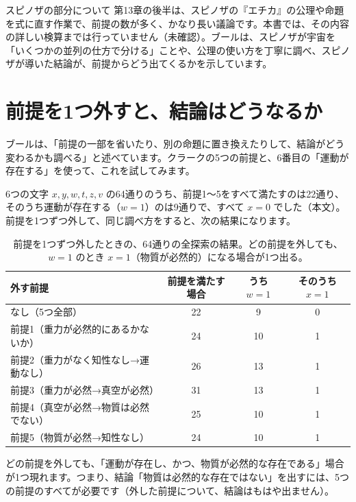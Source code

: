 \documentclass[a4paper,11pt,openany]{ltjsbook}
\begin{document}
\begin{notebox}{スピノザの部分について}
第13章の後半は、スピノザの『エチカ』の公理や命題を式に直す作業で、前提の数が多く、かなり長い議論です。本書では、その内容の詳しい検算までは行っていません（未確認）。ブールは、スピノザが宇宙を「いくつかの並列の仕方で分ける」ことや、公理の使い方を丁寧に調べ、スピノザが導いた結論が、前提からどう出てくるかを示しています。
\end{notebox}

\section{前提を1つ外すと、結論はどうなるか}

ブールは、「前提の一部を省いたり、別の命題に置き換えたりして、結論がどう変わるかも調べる」と述べています。クラークの5つの前提と、6番目の「運動が存在する」を使って、これを試してみます。

6つの文字 $x,y,w,t,z,v$ の64通りのうち、前提1〜5をすべて満たすのは22通り、そのうち運動が存在する（$w=1$）のは9通りで、すべて $x=0$ でした（本文）。前提を1つずつ外して、同じ調べ方をすると、次の結果になります。

\begin{table}[htbp]
\centering
\small
\begin{tabular}{p{5.6cm}ccc}
\toprule
外す前提 & 前提を満たす場合 & うち $w=1$ & そのうち $x=1$\\
\midrule
なし（5つ全部） & 22 & 9 & 0\\
前提1（重力が必然的にあるかないか） & 24 & 10 & 1\\
前提2（重力がなく知性なし→運動なし） & 26 & 13 & 1\\
前提3（重力が必然→真空が必然） & 31 & 13 & 1\\
前提4（真空が必然→物質は必然でない） & 25 & 10 & 1\\
前提5（物質が必然→知性なし） & 24 & 10 & 1\\
\bottomrule
\end{tabular}
\caption{前提を1つずつ外したときの、64通りの全探索の結果。どの前提を外しても、$w=1$ のとき $x=1$（物質が必然的）になる場合が1つ出る。}
\end{table}

どの前提を外しても、「運動が存在し、かつ、物質が必然的な存在である」場合が1つ現れます。つまり、結論「物質は必然的な存在ではない」を出すには、5つの前提のすべてが必要です（外した前提について、結論はもはや出ません）。
\end{document}
